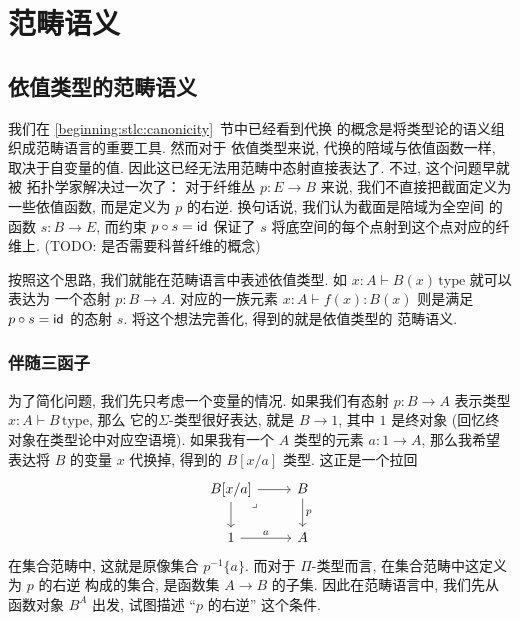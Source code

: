 \chapter{范畴语义}
\section{依值类型的范畴语义}
我们在 \ref{beginning:stlc:canonicity}~节中已经看到代换
的概念是将类型论的语义组织成范畴语言的重要工具. 然而对于
依值类型来说, 代换的陪域与依值函数一样, 取决于自变量的值.
因此这已经无法用范畴中态射直接表达了. 不过, 这个问题早就被
拓扑学家解决过一次了： 对于纤维丛 \(p : E \to B\)
来说, 我们不直接把截面定义为一些依值函数, 而是定义为
\(p\) 的右逆. 换句话说, 我们认为截面是陪域为全空间
的函数 \(s : B \to E\), 而约束 \(p \circ s = \textsf{id}\)
保证了 \(s\) 将底空间的每个点射到这个点对应的纤维上.
(TODO: 是否需要科普纤维的概念)

按照这个思路, 我们就能在范畴语言中表述依值类型. 如
\(x{:}A \vdash B(x)\,\text{type}\) 就可以表达为
一个态射 \(p : B \to A\). 对应的一族元素
\(x{:}A \vdash f(x) : B(x)\) 则是满足 \(p \circ s = \textsf{id}\)
的态射 \(s\). 将这个想法完善化, 得到的就是依值类型的
范畴语义.

\subsection{伴随三函子}
为了简化问题, 我们先只考虑一个变量的情况.
如果我们有态射 \(p : B \to A\) 表示类型
\(x{:}A \vdash B\,\text{type}\), 那么
它的\(\Sigma\)-类型很好表达, 就是 \(B \to 1\),
其中 \(1\) 是终对象 (回忆终对象在类型论中对应空语境).
如果我有一个 \(A\) 类型的元素 \(a : 1 \to A\),
那么我希望表达将 \(B\) 的变量 \(x\) 代换掉, 得到的
\(B[x/a]\) 类型. 这正是一个拉回
\[\begin{tikzcd}
  B[x/a] & B \\
  1 & A
  \arrow["a", from=2-1, to=2-2]
  \arrow["p", from=1-2, to=2-2]
  \arrow[from=1-1, to=2-1]
  \arrow[from=1-1, to=1-2]
  \arrow["\lrcorner"{anchor=center, pos=0.125}, draw=none, from=1-1, to=2-2]
\end{tikzcd}\]
在集合范畴中, 这就是原像集合 \(p^{-1}\{a\}\). 而对于
\(\Pi\)-类型而言, 在集合范畴中这定义为 \(p\) 的右逆
构成的集合, 是函数集 \(A \to B\) 的子集. 因此在范畴语言中,
我们先从函数对象 \(B^A\) 出发, 试图描述 “\(p\) 的右逆” 这个条件.

